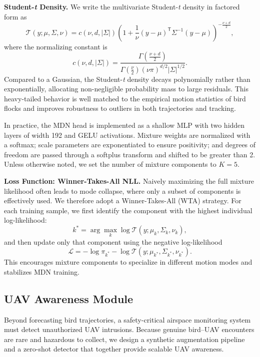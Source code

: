 \documentclass[journal]{IEEEtran}
\begin{document}
\textbf{Student-\textit{t} Density.}
We write the multivariate Student-\textit{t} density in factored form as
\begin{equation}
	\mathcal{T}(y; \mu, \Sigma, \nu)
	= c(\nu, d, |\Sigma|)
	\left(1 + \frac{1}{\nu} (y - \mu)^{\mathsf{T}} \Sigma^{-1} (y - \mu)\right)^{-\frac{\nu + d}{2}},
	\label{eq:studentt}
\end{equation}
where the normalizing constant is
\begin{equation}
	c(\nu, d, |\Sigma|)
	= \frac{\Gamma\left(\frac{\nu + d}{2}\right)}
	{\Gamma\left(\frac{\nu}{2}\right) (\nu \pi)^{d/2} |\Sigma|^{1/2}}.
\end{equation}
Compared to a Gaussian, the Student-\textit{t} density decays polynomially rather than exponentially, allocating non-negligible probability mass to large residuals. This heavy-tailed behavior is well matched to the empirical motion statistics of bird flocks and improves robustness to outliers in both trajectories and tracking.

In practice, the MDN head is implemented as a shallow MLP with two hidden layers of width 192 and GELU activations. Mixture weights are normalized with a softmax; scale parameters are exponentiated to ensure positivity; and degrees of freedom are passed through a softplus transform and shifted to be greater than 2. Unless otherwise noted, we set the number of mixture components to $K=5$.

\textbf{Loss Function: Winner-Takes-All NLL.}
Naively maximizing the full mixture likelihood often leads to mode collapse, where only a subset of components is effectively used. We therefore adopt a Winner-Takes-All (WTA) strategy. For each training sample, we first identify the component with the highest individual log-likelihood:
\[
k^* = \arg\max_k \log \mathcal{T}(y; \mu_k, \Sigma_k, \nu_k),
\]
and then update only that component using the negative log-likelihood
\[
\mathcal{L} = -\log \pi_{k^*} - \log \mathcal{T}(y; \mu_{k^*}, \Sigma_{k^*}, \nu_{k^*}).
\]
This encourages mixture components to specialize in different motion modes and stabilizes MDN training.

\subsection{UAV Awareness Module}
\label{sec:method_uav}

Beyond forecasting bird trajectories, a safety-critical airspace monitoring system must detect unauthorized UAV intrusions. Because genuine bird--UAV encounters are rare and hazardous to collect, we design a synthetic augmentation pipeline and a zero-shot detector that together provide scalable UAV awareness.
\end{document}
